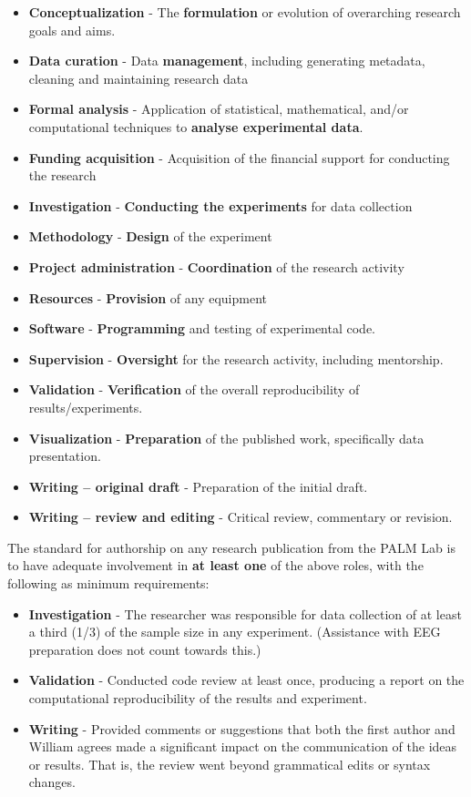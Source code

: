 \documentclass[
]{book}
\providecommand{\tightlist}{%
  \setlength{\itemsep}{0pt}\setlength{\parskip}{0pt}}
\theoremstyle{definition}
\theoremstyle{definition}
\theoremstyle{definition}
\theoremstyle{definition}
\theoremstyle{remark}
\begin{document}
\begin{itemize}
\tightlist
\item
  \textbf{Conceptualization} - The \textbf{formulation} or evolution of overarching research goals and aims.
\item
  \textbf{Data curation} - Data \textbf{management}, including generating metadata, cleaning and maintaining research data
\item
  \textbf{Formal analysis} - Application of statistical, mathematical, and/or computational techniques to \textbf{analyse experimental data}.
\item
  \textbf{Funding acquisition} - Acquisition of the financial support for conducting the research
\item
  \textbf{Investigation} - \textbf{Conducting the experiments} for data collection
\item
  \textbf{Methodology} - \textbf{Design} of the experiment
\item
  \textbf{Project administration} - \textbf{Coordination} of the research activity
\item
  \textbf{Resources} - \textbf{Provision} of any equipment
\item
  \textbf{Software} - \textbf{Programming} and testing of experimental code.
\item
  \textbf{Supervision} - \textbf{Oversight} for the research activity, including mentorship.
\item
  \textbf{Validation} - \textbf{Verification} of the overall reproducibility of results/experiments.
\item
  \textbf{Visualization} - \textbf{Preparation} of the published work, specifically data presentation.
\item
  \textbf{Writing -- original draft} - Preparation of the initial draft.
\item
  \textbf{Writing -- review and editing} - Critical review, commentary or revision.
\end{itemize}

The standard for authorship on any research publication from the PALM Lab is to have adequate involvement in \textbf{at least one} of the above roles, with the following as minimum requirements:

\begin{itemize}
\tightlist
\item
  \textbf{Investigation} - The researcher was responsible for data collection of at least a third (1/3) of the sample size in any experiment. (Assistance with EEG preparation does not count towards this.)
\item
  \textbf{Validation} - Conducted code review at least once, producing a report on the computational reproducibility of the results and experiment.
\item
  \textbf{Writing} - Provided comments or suggestions that both the first author and William agrees made a significant impact on the communication of the ideas or results. That is, the review went beyond grammatical edits or syntax changes.
\end{itemize}
\end{document}
